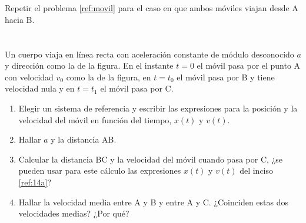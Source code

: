\documentclass[a4paper, 12pt, fleqn]{article}
\begin{document}
\section{}

Repetir el problema \ref{ref:movil} para el caso en que ambos móviles viajan desde A hacia B.

\section{}

Un cuerpo viaja en línea recta con aceleración constante de módulo desconocido $a$ y dirección como la de la figura. En el instante $t = 0$ el móvil pasa por el punto A con velocidad $v_0$ como la de la figura, en $t = t_0$ el móvil pasa por B y tiene velocidad nula y en $t = t_1$ el móvil pasa por C.
    \begin{enumerate}[label=(\alph*)]
        \item Elegir un sistema de referencia y escribir las expresiones para la posición y la velocidad del móvil en función del tiempo, $x(t)$ y $v(t)$. \label{ref:14a}
        \item Hallar $a$ y la distancia AB.
        \item Calcular la distancia BC y la velocidad del móvil cuando pasa por C, ¿se pueden usar para este cálculo las expresiones $x(t)$ y $v(t)$ del inciso \ref{ref:14a}?
        \item Hallar la velocidad media entre A y B y entre A y C. ¿Coinciden estas dos velocidades medias? ¿Por qué?
    \end{enumerate}
    
\begin{center}
\end{center}

\section{}
\end{document}
